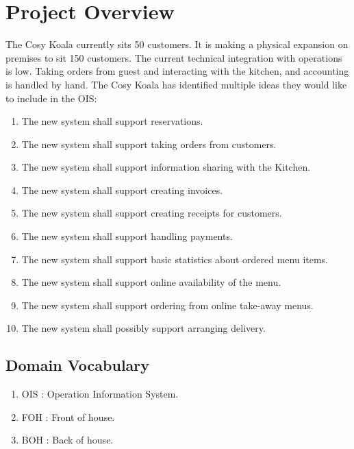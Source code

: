 \documentclass{article}
\begin{document}
\section{Project Overview}
The Cosy Koala currently sits 50 customers. It is making a physical expansion on premises to sit 150 customers. The current technical integration with operations is low. Taking orders from guest and interacting with the kitchen, and accounting is handled by hand.
The Cosy Koala has identified multiple ideas they would like to include in the OIS:
\begin{enumerate}
    \item The new system shall support reservations.
    \item The new system shall support taking orders from customers.
    \item The new system shall support information sharing with the Kitchen.
    \item The new system shall support creating invoices.
    \item The new system shall support creating receipts for customers.
    \item The new system shall support handling payments.
    \item The new system shall support basic statistics about ordered menu items.
    \item The new system shall support online availability of the menu.
    \item The new system shall support ordering from online take-away menus.
    \item The new system shall possibly support arranging delivery.
\end{enumerate}

\subsection{Domain Vocabulary}
\begin{enumerate}
    \item OIS : Operation Information System.
    \item FOH : Front of house.
    \item BOH : Back of house.
\end{enumerate}
\end{document}
